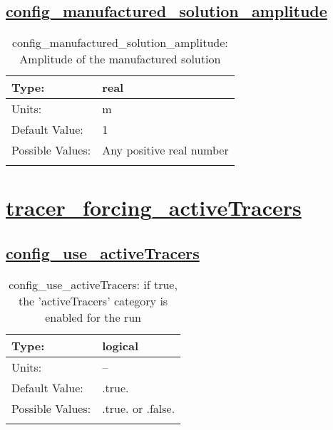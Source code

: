 \subsection[config\_manufactured\_solution\_amplitude]{\hyperref[sec:nm_tab_manufactured_solution]{config\_manufactured\_solution\_amplitude}}
\label{subsec:nm_sec_config_manufactured_solution_amplitude}
\begin{center}
\begin{longtable}{| p{2.0in} || p{4.0in} |}
    \hline
    Type: & real \\
    \hline
    Units: & \si{m} \\
    \hline
    Default Value: & 1 \\
    \hline
    Possible Values: & Any positive real number \\
    \hline
    \caption{config\_manufactured\_solution\_amplitude: Amplitude of the manufactured solution}
\end{longtable}
\end{center}
\section[tracer\_forcing\_activeTracers]{\hyperref[sec:nm_tab_tracer_forcing_activeTracers]{tracer\_forcing\_activeTracers}}
\label{sec:nm_sec_tracer_forcing_activeTracers}
\subsection[config\_use\_activeTracers]{\hyperref[sec:nm_tab_tracer_forcing_activeTracers]{config\_use\_activeTracers}}
\label{subsec:nm_sec_config_use_activeTracers}
\begin{center}
\begin{longtable}{| p{2.0in} || p{4.0in} |}
    \hline
    Type: & logical \\
    \hline
    Units: & -- \\
    \hline
    Default Value: & .true. \\
    \hline
    Possible Values: & .true. or .false. \\
    \hline
    \caption{config\_use\_activeTracers: if true, the 'activeTracers' category is enabled for the run}
\end{longtable}
\end{center}
